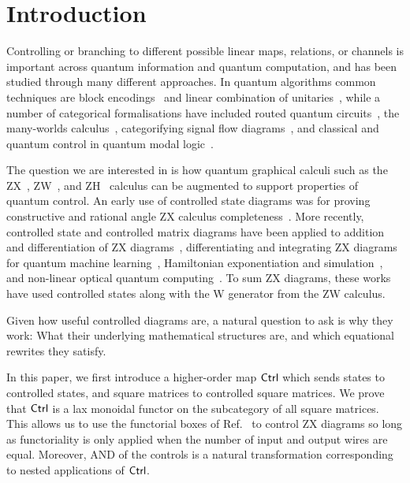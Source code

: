 \section{Introduction}
Controlling or branching to different possible linear maps, relations, or channels is important across quantum information and quantum computation, and has been studied through many different approaches. In quantum algorithms common techniques are block encodings~\cite{gilyen2019qsvt, rall2020qalgsblockenc} and linear combination of unitaries~\cite{childs2012hamsimlcu}, while a number of categorical formalisations have included routed quantum circuits~\cite{vanrietvelde2021routed}, the many-worlds calculus~\cite{chardonnet2023manyworlds}, categorifying signal flow diagrams~\cite{baez2015categoriesctrl}, and classical and quantum control in quantum modal logic~\cite{sati2023quantummonadology}.

The question we are interested in is how quantum graphical calculi such as the ZX~\cite{coecke2011zx}, ZW~\cite{coecke2010zw}, and ZH~\cite{backens2019zh} calculus can be augmented to support properties of quantum control.
An early use of controlled state diagrams was for proving constructive and rational angle ZX calculus completeness~\cite{jeandel2018zxconstructive}. More recently, controlled state and controlled matrix diagrams have been applied to addition and differentiation of ZX diagrams~\cite{jeandel2024adddiffzx}, differentiating and integrating ZX diagrams for quantum machine learning~\cite{wang2022diffintzx}, Hamiltonian exponentiation and simulation~\cite{shaikh2022sum}, and non-linear optical quantum computing~\cite{de2023light}. To sum ZX diagrams, these works have used controlled states along with the W generator from the ZW calculus.

Given how useful controlled diagrams are, a natural question to ask is why they work: What their underlying mathematical structures are, and which equational rewrites they satisfy.

In this paper, we first introduce a higher-order map $\textsf{Ctrl}$ which sends states to controlled states, and square matrices to controlled square matrices. We prove that $\textsf{Ctrl}$ is a lax monoidal functor on the subcategory of all square matrices. This allows us to use the functorial boxes of Ref.~\cite{mellies2006functorial} to control ZX diagrams so long as functoriality is only applied when the number of input and output wires are equal. Moreover, AND of the controls is a natural transformation corresponding to nested applications of $\textsf{Ctrl}$.

